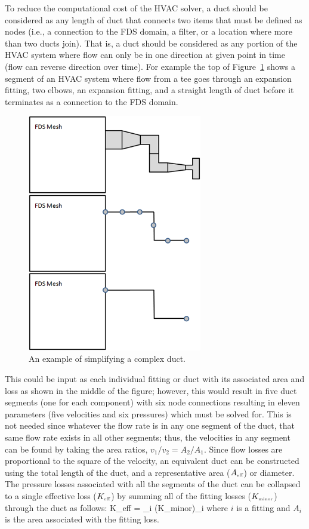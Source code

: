 \documentclass[11pt]{book}
\begin{document}
To reduce the computational cost of the HVAC solver, a duct should be considered as any length of duct that connects two items that must be defined as nodes (i.e., a connection to the FDS domain, a filter, or a location where more than two ducts join).  That is, a duct should be considered as any portion of the HVAC system where flow can only be in one direction at given point in time (flow can reverse direction over time).  For example the top of Figure~\ref{fig:HVAC_Simplify} shows a segment of an HVAC system where flow from a tee goes through an expansion fitting, two elbows, an expansion fitting, and a straight length of duct before it terminates as a connection to the FDS domain.

\begin{figure}[ht]
\begin{center}
\includegraphics[width=3in]{FIGURES/hvac-simplify}
\end{center}
\caption[An example of simplifying a complex duct]{An example of simplifying a complex duct.}
\label{fig:HVAC_Simplify}
\end{figure}

This could be input as each individual fitting or duct with its associated area and loss as shown in the middle of the figure; however, this would result in five duct segments (one for each component) with six node connections resulting in eleven parameters (five velocities and six pressures) which must be solved for.  This is not needed since whatever the flow rate is in any one segment of the duct, that same flow rate exists in all other segments; thus, the velocities in any segment can be found by taking the area ratios, $v_1/v_2=A_2/A_1$.  Since flow losses are proportional to the square of the velocity, an equivalent duct can be constructed using the total length of the duct, and a representative area ($A_{\mbox{\tiny eff}}$) or diameter.  The pressure losses associated with all the segments of the duct can be collapsed to a single effective loss ($K_{\mbox{\tiny eff}}$) by summing all of the fitting losses ($K_{\mbox{\tiny minor}}$) through the duct as follows:
\be K_{\mbox{\tiny eff}} = \sum_i {(K_{\mbox{\tiny minor}})_i } \ee
where $i$ is a fitting and $A_i$ is the area associated with the fitting loss.
\end{document}
